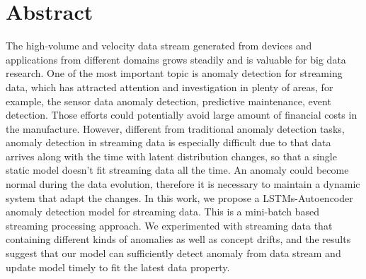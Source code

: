 \chapter*{Abstract}
\label{chap:abstract}
The high-volume and velocity data stream generated from devices and applications from different domains grows steadily and is valuable for big data research. One of the most important topic is anomaly detection for streaming data, which has attracted attention and investigation in plenty of areas, for example, the sensor data anomaly detection, predictive maintenance, event detection. Those efforts could potentially avoid large amount of financial costs in the manufacture. However, different from traditional anomaly detection tasks, anomaly detection in streaming data is especially difficult due to that data arrives along with the time with latent distribution changes, so that a single static model doesn’t fit streaming data all the time. An anomaly could become normal during the data evolution, therefore it is necessary to maintain a dynamic system that adapt the changes. In this work, we propose a LSTMs-Autoencoder anomaly detection model for streaming data. This is a mini-batch based streaming processing approach. We experimented with streaming data that containing different kinds of anomalies as well as concept drifts, and the results suggest that our model can sufficiently detect anomaly from data stream and update model timely to fit the latest data property.

